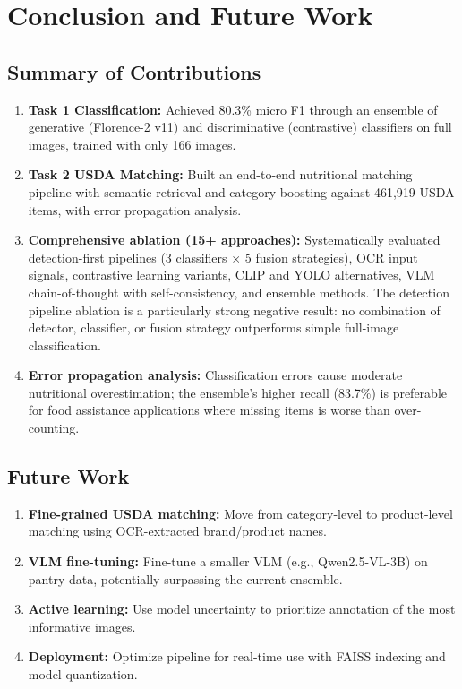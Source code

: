 \documentclass[11pt]{article}
\begin{document}
\section{Conclusion and Future Work}

\subsection{Summary of Contributions}

\begin{enumerate}[nosep,leftmargin=1.5em]
  \item \textbf{Task 1 Classification:} Achieved 80.3\% micro F1 through an ensemble of generative (Florence-2 v11) and discriminative (contrastive) classifiers on full images, trained with only 166 images.
  \item \textbf{Task 2 USDA Matching:} Built an end-to-end nutritional matching pipeline with semantic retrieval and category boosting against 461,919 USDA items, with error propagation analysis.
  \item \textbf{Comprehensive ablation (15+ approaches):} Systematically evaluated detection-first pipelines (3 classifiers $\times$ 5 fusion strategies), OCR input signals, contrastive learning variants, CLIP and YOLO alternatives, VLM chain-of-thought with self-consistency, and ensemble methods. The detection pipeline ablation is a particularly strong negative result: no combination of detector, classifier, or fusion strategy outperforms simple full-image classification.
  \item \textbf{Error propagation analysis:} Classification errors cause moderate nutritional overestimation; the ensemble's higher recall (83.7\%) is preferable for food assistance applications where missing items is worse than over-counting.
\end{enumerate}

\subsection{Future Work}

\begin{enumerate}[nosep,leftmargin=1.5em]
  \item \textbf{Fine-grained USDA matching:} Move from category-level to product-level matching using OCR-extracted brand/product names.
  \item \textbf{VLM fine-tuning:} Fine-tune a smaller VLM (e.g., Qwen2.5-VL-3B) on pantry data, potentially surpassing the current ensemble.
  \item \textbf{Active learning:} Use model uncertainty to prioritize annotation of the most informative images.
  \item \textbf{Deployment:} Optimize pipeline for real-time use with FAISS indexing and model quantization.
\end{enumerate}
\end{document}
